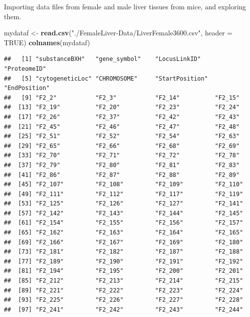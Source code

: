 \documentclass[]{article}
\newenvironment{Shaded}{\begin{snugshade}}{\end{snugshade}}
\newcommand{\DataTypeTok}[1]{\textcolor[rgb]{0.13,0.29,0.53}{#1}}
\newcommand{\KeywordTok}[1]{\textcolor[rgb]{0.13,0.29,0.53}{\textbf{#1}}}
\newcommand{\NormalTok}[1]{#1}
\newcommand{\OtherTok}[1]{\textcolor[rgb]{0.56,0.35,0.01}{#1}}
\newcommand{\StringTok}[1]{\textcolor[rgb]{0.31,0.60,0.02}{#1}}
\begin{document}
Importing data files from female and male liver tissues from mice, and
exploring them.

\begin{Shaded}
\begin{Highlighting}[]
\NormalTok{mydataf <-}\StringTok{ }\KeywordTok{read.csv}\NormalTok{(}\StringTok{"./FemaleLiver-Data/LiverFemale3600.csv"}\NormalTok{, }\DataTypeTok{header =} \OtherTok{TRUE}\NormalTok{) }
\KeywordTok{colnames}\NormalTok{(mydataf)}
\end{Highlighting}
\end{Shaded}

\begin{verbatim}
##   [1] "substanceBXH"   "gene_symbol"    "LocusLinkID"    "ProteomeID"    
##   [5] "cytogeneticLoc" "CHROMOSOME"     "StartPosition"  "EndPosition"   
##   [9] "F2_2"           "F2_3"           "F2_14"          "F2_15"         
##  [13] "F2_19"          "F2_20"          "F2_23"          "F2_24"         
##  [17] "F2_26"          "F2_37"          "F2_42"          "F2_43"         
##  [21] "F2_45"          "F2_46"          "F2_47"          "F2_48"         
##  [25] "F2_51"          "F2_52"          "F2_54"          "F2_63"         
##  [29] "F2_65"          "F2_66"          "F2_68"          "F2_69"         
##  [33] "F2_70"          "F2_71"          "F2_72"          "F2_78"         
##  [37] "F2_79"          "F2_80"          "F2_81"          "F2_83"         
##  [41] "F2_86"          "F2_87"          "F2_88"          "F2_89"         
##  [45] "F2_107"         "F2_108"         "F2_109"         "F2_110"        
##  [49] "F2_111"         "F2_112"         "F2_117"         "F2_119"        
##  [53] "F2_125"         "F2_126"         "F2_127"         "F2_141"        
##  [57] "F2_142"         "F2_143"         "F2_144"         "F2_145"        
##  [61] "F2_154"         "F2_155"         "F2_156"         "F2_157"        
##  [65] "F2_162"         "F2_163"         "F2_164"         "F2_165"        
##  [69] "F2_166"         "F2_167"         "F2_169"         "F2_180"        
##  [73] "F2_181"         "F2_182"         "F2_187"         "F2_188"        
##  [77] "F2_189"         "F2_190"         "F2_191"         "F2_192"        
##  [81] "F2_194"         "F2_195"         "F2_200"         "F2_201"        
##  [85] "F2_212"         "F2_213"         "F2_214"         "F2_215"        
##  [89] "F2_221"         "F2_222"         "F2_223"         "F2_224"        
##  [93] "F2_225"         "F2_226"         "F2_227"         "F2_228"        
##  [97] "F2_241"         "F2_242"         "F2_243"         "F2_244"        

\end{verbatim}
\end{document}
